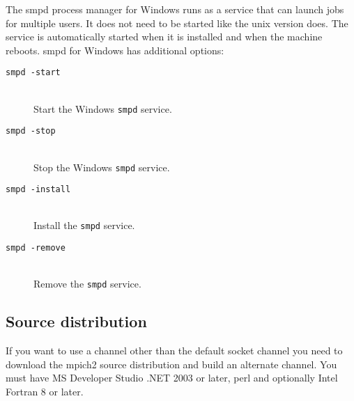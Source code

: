 \documentclass[dvipdfm,11pt]{article}
\begin{document}
The smpd process manager for Windows runs as a service that can launch jobs 
for multiple users.  It does not need to be started like the unix version 
does.  The service is automatically started when it is installed and when 
the machine reboots.  smpd for Windows has additional options:
\begin{description}
\item[\texttt{smpd -start}]\mbox{}\\
Start the Windows \texttt{smpd} service.
\item[\texttt{smpd -stop}]\mbox{}\\
Stop the Windows \texttt{smpd} service.
\item[\texttt{smpd -install}]\mbox{}\\
Install the \texttt{smpd} service.
\item[\texttt{smpd -remove}]\mbox{}\\
Remove the \texttt{smpd} service.
\end{description}

\subsection{Source distribution}
\label{sec:winsrc}

If you want to use a channel other than the default socket channel you need 
to download the mpich2 source distribution and build an alternate channel.  
You must have MS Developer Studio .NET 2003 or later, perl and optionally 
Intel Fortran 8 or later.
\end{document}
